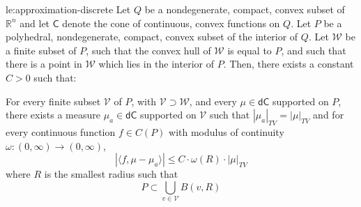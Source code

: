 \documentclass[12pt]{amsart}
\begin{document}
\begin{lemma}{le:approximation-discrete}
Let $Q$ be a nondegenerate, compact, convex subset of $\mathbb{R}^n$ and let $\mathsf{C}$ denote the cone of continuous, convex functions on $Q$. Let $P$ be a polyhedral, nondegenerate, compact, convex subset of the interior of $Q$. Let $\mathcal{W}$ be a finite subset of $P$, such that the convex hull of $\mathcal{W}$ is equal to $P$, and such that there is a point in $\mathcal{W}$ which lies in the interior of $P$. Then, there exists a constant $C> 0$ such that:


For every finite subset $\mathcal{V}$ of $P$, with $\mathcal{V} \supset \mathcal{W}$, and every $\mu \in \mathsf{dC}$ supported on $P$, there exists a measure $\mu_{a} \in \mathsf{dC}$ supported on $\mathcal{V}$ such that $|\mu_a|_{TV} = |\mu|_{TV}$ and for every continuous function $f \in C(P)$ with modulus of continuity $\omega:(0,\infty) \to (0,\infty)$,
\[
|\langle f , \mu - \mu_a \rangle | \leq C \cdot \omega(R) \cdot  |\mu|_{TV} 
\]
where $R$ is the smallest radius such that
\[
P \subset \bigcup_{v \in \mathcal{V}} B(v, R)
\]
\end{lemma}
\end{document}
